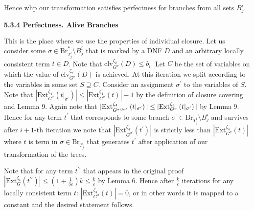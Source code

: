 Hence whp our transformation satisfies perfectness for branches from all sets $B^{i}_{j}$.\par






\par\medskip\noindent\textbf{
5.3.4 Perfectness. Alive Branches}\par




This is the place where we use the properties of individual closure. Let us consider some $\sigma\in\mathrm{Br}^{*}_{T^{i}_{j}}\setminus B^{i}_{j}$ that is marked by a DNF $D$ and an arbitrary locally consistent term $t\in D$. Note that $\mathrm{clv}_{G^{\sigma}}^{\zeta_{2}}\left(D\right)\leq b_{i}$. Let $C$ be the set of variables on which the value
of $\mathrm{clv}_{G^{\sigma}}^{\zeta_{2}}\left(D\right)$ is achieved. At this iteration we split according to the variables in
some set $S\supseteq C$. Consider an assignment $\sigma^{\prime}$ to the variables
of $S$. Note that $|\mathrm{Ext}_{G^{\sigma}}^{\zeta_{4}}\left(t|_{\sigma^{\prime}}\right)|\leq|%
\mathrm{Ext}_{G^{\sigma}}^{\zeta_{4}}\left(t\right)|-1$ by the
definition of closure covering and Lemma 9. Again note that
$|\mathrm{Ext}_{G^{\sigma\cup\sigma^{\prime}}}^{\zeta_{4}}\left(t|_{\sigma^{%
\prime}}\right)|\leq|\mathrm{Ext}_{G^{\sigma}}^{\zeta_{4}}\left(t|_{\sigma^{%
\prime}}\right)|$ by
Lemma 9. Hence for any term $t^{\prime}$ that corresponds to some branch $\sigma^{\prime}\in\mathrm{Br}_{T^{i}_{j}}\setminus B^{i}_{j}$ and survives after $i+1$-th iteration we note that
$|\mathrm{Ext}_{G^{\sigma^{\prime}}}^{\zeta_{4}}\left(t^{\prime}\right)|$ is strictly less than $|\mathrm{Ext}_{G^{\sigma}}^{\zeta_{4}}\left(t\right)|$ where $t$ is
term in $\sigma\in\mathrm{Br}_{T^{i}_{j}}$ that generates $t^{\prime}$ after application of our transformation of the trees.\par




Note that for any term $t^{\prime\prime}$ that appears in the original proof
$|\mathrm{Ext}_{G}^{\zeta_{4}}\left(t^{\prime\prime}\right)|\leq\left(1+\frac{1%
}{3\varepsilon}\right)k\leq\frac{k}{\varepsilon}$ by
Lemma 6. Hence after $\frac{k}{\varepsilon}$ iterations for any locally consistent
term $t$: $|\mathrm{Ext}_{G^{\sigma}}^{\zeta_{4}}\left(t\right)|=0$, or in other words it is mapped to a constant and the
desired statement follows.\par





